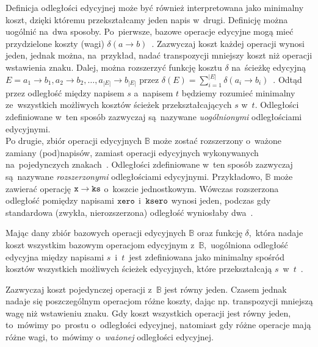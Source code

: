 \documentclass{praca1}
\begin{document}
Definicja odległości edycyjnej może być również interpretowana jako minimalny koszt, dzięki któremu przekształcamy jeden napis w~drugi. Definicję można uogólnić na~dwa sposoby. Po~pierwsze, bazowe operacje edycyjne mogą mieć przydzielone koszty (wagi) $\delta(a \rightarrow b)$~\cite{Wagner1974:stringtostring}. Zazwyczaj koszt każdej operacji wynosi jeden, jednak można, na~przykład, nadać transpozycji mniejszy koszt niż operacji wstawienia znaku. Dalej, można rozszerzyć funkcję kosztu $\delta$ na~ścieżkę edycyjną $E = a_1 \rightarrow b_1, a_2 \rightarrow b_2, \ldots, a_{|E|} \rightarrow b_{|E|}$ przez $\delta(E) = \sum\limits_{i=1}^{|E|}\delta(a_i \rightarrow b_i)$~\cite{Boytsov2011:indexingmethods}. Odtąd przez odległość między napisem $s$ a~napisem $t$ będziemy rozumieć minimalny ze~wszystkich możliwych kosztów ścieżek przekształcających $s$ w~$t$. Odległości zdefiniowane w~ten sposób zazwyczaj są~nazywane \emph{uogólnionymi} odległościami edycyjnymi.\\
Po drugie, zbiór operacji edycyjnych $\mathbb{B}$ może zostać rozszerzony o~ważone zamiany (pod)napisów, zamiast operacji edycyjnych wykonywanych na~pojedynczych znakach~\cite{Ukkonen1985:algorithmsforapprox}. Odległości zdefiniowane w~ten sposób zazwyczaj są~nazywane \emph{rozszerzonymi} odległościami edycyjnymi. Przykładowo, $\mathbb{B}$ może zawierać operację $\verb|x| \rightarrow \verb|ks|$ o~koszcie jednostkowym. Wówczas rozszerzona odległość pomiędzy napisami $\verb|xero|$ i~$\verb|ksero|$ wynosi jeden, podczas gdy standardowa (zwykła, nierozszerzona) odległość wyniosłaby dwa~\cite{Boytsov2011:indexingmethods}.

\begin{definition}\label{def:002}
Mając dany zbiór bazowych operacji edycyjnych $\mathbb{B}$ oraz funkcję $\delta$,~która nadaje koszt wszystkim bazowym operacjom edycyjnym z~$\mathbb{B}$,~uogólniona odległość edycyjna między napisami $s$~i~$t$~jest zdefiniowana jako minimalny spośród kosztów wszystkich możliwych ścieżek edycyjnych, które przekształcają $s$~w~$t$~\cite{Boytsov2011:indexingmethods}.
\end{definition}

Zazwyczaj koszt pojedynczej operacji z~$\mathbb{B}$ jest równy jeden. Czasem jednak nadaje się poszczególnym operacjom różne koszty, dając np. transpozycji mniejszą wagę niż wstawieniu znaku. Gdy koszt wszystkich operacji jest równy jeden, to~mówimy po~prostu o~odległości edycyjnej, natomiast gdy różne operacje mają różne wagi, to~mówimy o~\emph{ważonej} odległości edycyjnej.
\end{document}
